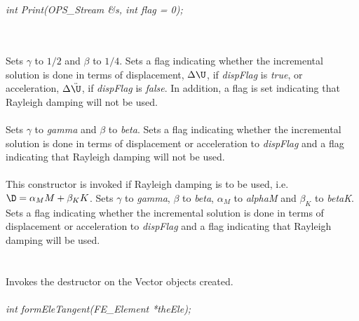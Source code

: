 \\ 
\\ 
{\em int Print(OPS_Stream \&s, int flag = 0);}



 \\
\\ 
Sets $\gamma$ to $1/2$ and $\beta$ to $1/4$. Sets a flag indicating
whether the incremental solution is done in terms of displacement,
$\Delta \U$, if {\em dispFlag} is {\em true}, or  
acceleration, $\Delta \ddot \U$, if {\em dispFlag} is {\em false}. In
addition, a flag is set indicating that Rayleigh damping will not be used. \\


\\ 
Sets $\gamma$ to {\em gamma} and $\beta$ to {\em beta}. Sets a flag
indicating whether the incremental solution is done in terms of
displacement or acceleration to {\em dispFlag} and a flag indicating
that Rayleigh damping will not be used. \\


\\ 
This constructor is invoked if Rayleigh damping is to be used, 
i.e. $\D = \alpha_M M + \beta_K K$. 
Sets $\gamma$ to {\em gamma}, $\beta$ to {\em beta}, $\alpha_M$ to
{\em alphaM} and $\beta_K$ to {\em betaK}. Sets a flag indicating whether the
incremental solution is done in terms of displacement or acceleration
to {\em dispFlag} and a flag indicating that Rayleigh damping will 
be used. \\ 

 \\
\\ 
Invokes the destructor on the Vector objects created. \\

\\
{\em int formEleTangent(FE\_Element *theEle);} 

